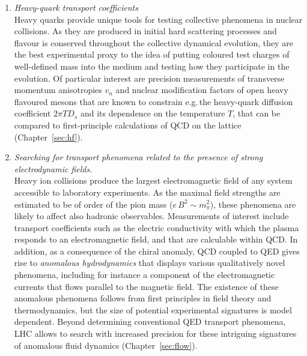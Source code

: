 \documentclass[../report.tex]{subfiles}
\begin{document}
\begin{enumerate}
\item {\it Heavy-quark transport coefficients}\\ Heavy quarks provide unique tools for testing collective phenomena in nuclear collisions. As they are produced in initial hard scattering processes and flavour is conserved throughout the collective dynamical evolution, they are the best experimental proxy to the idea of putting coloured test charges of well-defined mass into the medium and testing how they participate in the evolution. Of particular interest are precision measurements of transverse momentum anisotropies $v_n$ and nuclear modification factors of open heavy flavoured mesons that are known to constrain e.g.\,the heavy-quark diffusion coefficient $2\pi T D_s$ and its dependence on the temperature $T$, that can be compared to first-principle calculations of QCD on the lattice (Chapter~\ref{sec:hf}).
\item {\it Searching for transport phenomena related to the presence of strong electrodynamic fields.}\\ Heavy ion collisions produce the largest electromagnetic field of any system accessible to laboratory experiments. As the maximal field strengths are estimated to be of order of the pion mass ($e\, B^2 \sim m_\pi^2$), these phenomena are likely to affect also hadronic observables. Measurements of interest include transport coefficients such as the electric conductivity with which the plasma responds to an electromagnetic field, and that are calculable within QCD. In addition, as a consequence of the chiral anomaly, QCD coupled to QED gives rise to {\it anomalous hydrodynamics} that displays various qualitatively novel phenomena, including for instance a component of the electromagnetic currents that flows parallel to the magnetic field. The existence of these anomalous phenomena follows from first principles in field theory and thermodynamics, but the size of potential experimental signatures is model dependent.  Beyond determining conventional QED transport phenomena, LHC allows to search with increased precision for these intriguing signatures of anomalous fluid dynamics (Chapter~\ref{sec:flow}). 
\end{enumerate}
\end{document}
